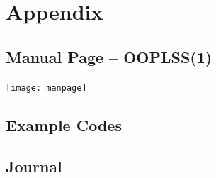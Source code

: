 \appendix
\part*{Appendix}

\chapter{Manual Page -- OOPLSS(1)}
\centerline{\texttt{[image: manpage]}}
%




\chapter{Example Codes}
\label{ctr:exampleCode}


\chapter{Journal}


